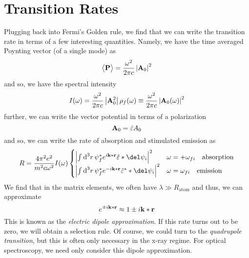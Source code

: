 \section{Transition Rates}
Plugging back into Fermi's Golden rule, we find that we can write the transition rate in terms of a few interesting quantities. Namely, we have the time averaged Poynting vector (of a single mode) as
\[\left\langle \begin{matrix}\mathbf{P}\end{matrix} \right\rangle = \frac{\omega^2}{2\pi c}\left|\mathbf{A}_0\right|^2\]
and so, we have the spectral intensity
\begin{equation}
	I(\omega) = \frac{\omega^2}{2\pi c}\left|\mathbf{A}_0^2\right|\rho_f(\omega)\equiv \frac{\omega^2}{2\pi c}\left|\mathbf{A}_0 (\omega)\right|^2
\end{equation}
further, we can write the vector potential in terms of a polarization
\[\mathbf{A}_0 = \hat \varepsilon A_0\]
and so, we can write the rate of absorption and stimulated emission as
\begin{equation}
	R=\frac{4\pi^2 e^2}{m^2 c\omega^2}I(\omega) \begin{cases}
		\abs{\int\d[3]{r}\p\ast_fe^{i\vb k*\vb r}\hat\varepsilon *\del\p_i}^2 & \omega = +\omega_{fi}\quad\text{absorption}\\
		\abs{\int\d[3]{r}\p\ast_fe^{-i\vb k*\vb r}\hat\varepsilon\ast *\del\p_i}^2 & \omega = \omega_{fi}\quad\text{emission}\\
	\end{cases}
\end{equation}
We find that in the matrix elements, we often have \(\lambda\gg R_{\text{atom}}\) and thus, we can approximate
\begin{equation}
	e^{\pm i\mathbf{k}*\mathbf{r}}\approx 1\pm i\mathbf{k}*\mathbf{r}
\end{equation}
This is known as the \emph{electric dipole approximation}. If this rate turns out to be zero, we will obtain a selection rule. Of course, we could turn to the \emph{quadrupole transition}, but this is often only necessary in the x-ray regime. For optical spectroscopy, we need only consider this dipole approximation.

